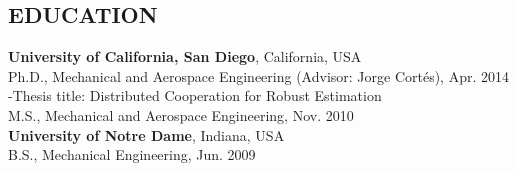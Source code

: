 \documentclass{res}
\begin{document}
\begin{resume}
\section{EDUCATION} 
\textbf{University of California, San Diego}, California, USA  \\
\vspace{0ex}
\quad Ph.D., Mechanical and Aerospace Engineering (Advisor: Jorge Cort\'es), Apr. 2014 \\
\vspace{0ex}
\qquad -Thesis title: Distributed Cooperation for Robust Estimation\\
\vspace{0ex}
%
\quad M.S., Mechanical and Aerospace Engineering, Nov. 2010\\
%
\vspace*{0ex}
\textbf{University of Notre Dame}, Indiana, USA \\
%
\vspace*{0ex}
\quad B.S., Mechanical Engineering, Jun. 2009
\vspace*{-3ex}

\end{resume}
\end{document}
